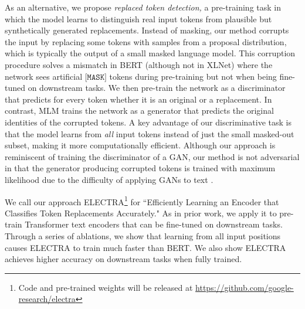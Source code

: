 \documentclass{article}
\begin{document}
As an alternative, we propose \emph{replaced token detection,} a pre-training task in which the model learns to distinguish real input tokens from plausible but synthetically generated replacements. 
Instead of masking, our method corrupts the input by replacing some tokens with samples from a proposal distribution, which is typically the output of a small masked language model.
This corruption procedure solves a mismatch in BERT (although not in XLNet) where the network sees artificial $\texttt{[MASK]}$ tokens during pre-training but not when being fine-tuned on downstream tasks.
We then pre-train the network as a discriminator that predicts for every token whether it is an original or a replacement. 
In contrast, MLM trains the network as a generator that predicts the original identities of the corrupted tokens.
A key advantage of our discriminative task is that the model learns from \emph{all} input tokens instead of just the small masked-out subset, making it more computationally efficient.
Although our approach is reminiscent of training the discriminator of a GAN, our method is not adversarial in that the generator producing corrupted tokens is trained with maximum likelihood due to the difficulty of applying GANs to text \citep{Caccia2018LanguageGF}.

We call our approach ELECTRA\footnote{Code and pre-trained weights will be released at \url{https://github.com/google-research/electra}} for ``Efficiently Learning an Encoder that Classifies Token Replacements Accurately." 
As in prior work, we apply it to pre-train Transformer text encoders \citep{Vaswani2017AttentionIA} that can be fine-tuned on downstream tasks.
Through a series of ablations, we show that learning from all input positions causes ELECTRA to train much faster than BERT.
We also show ELECTRA achieves higher accuracy on downstream tasks when fully trained.  
\end{document}
